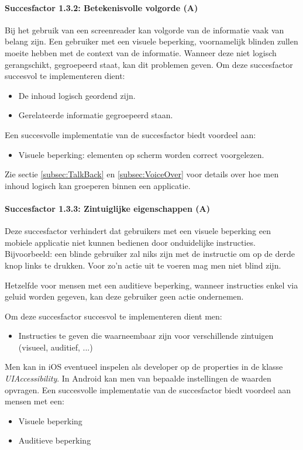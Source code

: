 \paragraph{Succesfactor 1.3.2:  Betekenisvolle volgorde (A)}
Bij het gebruik van een screenreader kan volgorde van de informatie vaak van belang zijn. Een gebruiker met een visuele beperking, voornamelijk blinden zullen moeite hebben met de context van de informatie. Wanneer deze niet logisch gerangschikt, gegroepeerd staat, kan dit problemen geven.
Om deze succesfactor succesvol te implementeren dient:
\begin{itemize}
    \item De inhoud logisch geordend zijn.
    \item Gerelateerde informatie gegroepeerd staan.
\end{itemize}
Een succesvolle implementatie van de succesfactor biedt voordeel aan:
\begin{itemize}
    \item Visuele beperking: elementen op scherm worden correct voorgelezen.
\end{itemize}
Zie sectie \ref{subsec:TalkBack} en \ref{subsec:VoiceOver} voor details over hoe men inhoud logisch kan groeperen binnen een applicatie.
\paragraph{Succesfactor 1.3.3:  Zintuiglijke eigenschappen (A)}
Deze succesfactor verhindert dat gebruikers met een visuele beperking een mobiele applicatie niet kunnen bedienen door onduidelijke instructies. Bijvoorbeeld: een blinde gebruiker zal niks zijn met de instructie om op de derde knop links te drukken. Voor zo'n actie uit te voeren mag men niet blind zijn. 

Hetzelfde voor mensen met een auditieve beperking, wanneer instructies enkel via geluid worden gegeven, kan deze gebruiker geen actie ondernemen.

Om deze succesfactor succesvol te implementeren dient men: 
\begin{itemize}
    \item Instructies te geven die waarneembaar zijn voor verschillende zintuigen (visueel, auditief, ...)
\end{itemize}

Men kan in iOS eventueel inspelen als developer op de properties in de klasse \emph{UIAccessibility}. In Android kan men van bepaalde instellingen de waarden opvragen. 
Een succesvolle implementatie van de succesfactor biedt voordeel aan mensen met een:
\begin{itemize}
    \item Visuele beperking
    \item Auditieve beperking
\end{itemize}

